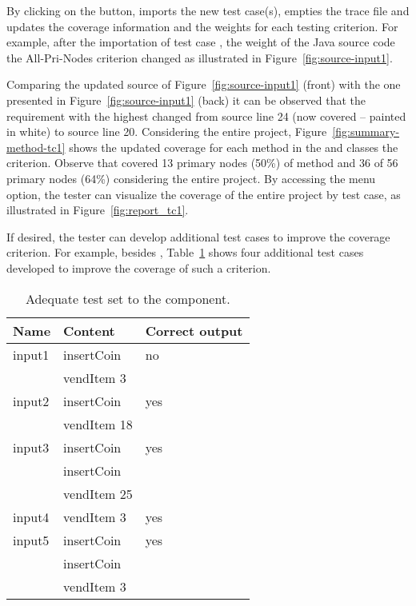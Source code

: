 

By clicking on the  button, \toolname imports the new
test case(s), empties the trace file  and
updates the coverage information and the weights for each testing
criterion. For example, after the importation of test case
, the weight of the Java source code \wrt the
All-Pri-Nodes criterion changed as illustrated in
Figure~\ref{fig:source-input1}.



Comparing the updated source of Figure~\ref{fig:source-input1}
(front) with the one presented in Figure~\ref{fig:source-input1}
(back) it can be observed that the requirement with the highest
changed from source line 24 (now covered -- painted in white) to
source line 20. Considering the entire project,
Figure~\ref{fig:summary-method-tc1} shows the updated coverage for
each method in the  and  classes
\wrt the  criterion. Observe that 
covered 13 primary nodes (50\%) of  method
and 36 of 56 primary nodes (64\%) considering the entire project.
By accessing the 
menu option, the tester can visualize the coverage of the entire
project by test case, as illustrated in
Figure~\ref{fig:report_tc1}.



If desired, the tester can develop additional test cases to
improve the coverage \wrt {} criterion. For
example, besides , Table~\ref{tab:adequate} shows four
additional test cases developed to improve the coverage of such a
criterion.

\begin{table}[!ht]
\caption{Adequate test set to the 
component.}\label{tab:adequate}
\begin{center}
\begin{tabular}{|l|l|l|}\hline
\textbf{Name} & \textbf{Content} & \textbf{Correct output}\\
\hline
input1  &   insertCoin      & no  \\
        &   vendItem 3      &     \\ \hline
input2  &   insertCoin      & yes \\
        &   vendItem 18     &     \\ \hline
input3  &   insertCoin      & yes \\
        &   insertCoin      &     \\
        &   vendItem 25     &     \\ \hline
input4  &   vendItem 3      & yes \\ \hline
input5  &   insertCoin      & yes \\
        &   insertCoin      &     \\
        &   vendItem 3      &     \\ \hline
\end{tabular}
\end{center}
\end{table}

